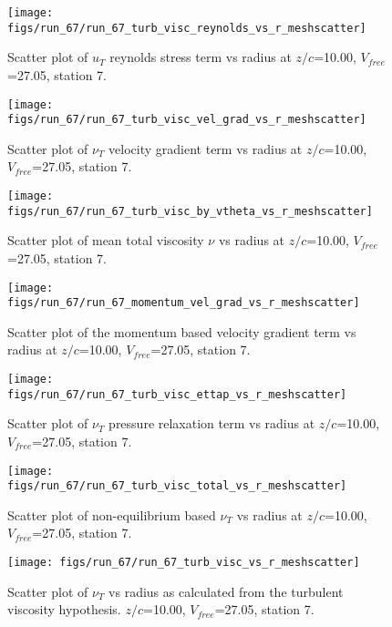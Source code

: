\begin{figure}[H]
\centering
\texttt{[image: figs/run\_67/run\_67\_turb\_visc\_reynolds\_vs\_r\_meshscatter]}
\caption{Scatter plot of $
u_T$ reynolds stress term vs radius at $z/c$=10.00, $V_{free}$=27.05, station 7.}
\end{figure}


\begin{figure}[H]
\centering
\texttt{[image: figs/run\_67/run\_67\_turb\_visc\_vel\_grad\_vs\_r\_meshscatter]}
\caption{Scatter plot of $\nu_T$ velocity gradient term vs radius at $z/c$=10.00, $V_{free}$=27.05, station 7.}
\end{figure}


\begin{figure}[H]
\centering
\texttt{[image: figs/run\_67/run\_67\_turb\_visc\_by\_vtheta\_vs\_r\_meshscatter]}
\caption{Scatter plot of mean total viscosity $\nu$ vs radius at $z/c$=10.00, $V_{free}$=27.05, station 7.}
\end{figure}


\begin{figure}[H]
\centering
\texttt{[image: figs/run\_67/run\_67\_momentum\_vel\_grad\_vs\_r\_meshscatter]}
\caption{Scatter plot of the momentum based velocity gradient term vs radius at $z/c$=10.00, $V_{free}$=27.05, station 7.}
\end{figure}


\begin{figure}[H]
\centering
\texttt{[image: figs/run\_67/run\_67\_turb\_visc\_ettap\_vs\_r\_meshscatter]}
\caption{Scatter plot of $\nu_T$ pressure relaxation term vs radius at $z/c$=10.00, $V_{free}$=27.05, station 7.}
\end{figure}


\begin{figure}[H]
\centering
\texttt{[image: figs/run\_67/run\_67\_turb\_visc\_total\_vs\_r\_meshscatter]}
\caption{Scatter plot of non-equilibrium based $\nu_T$ vs radius at $z/c$=10.00, $V_{free}$=27.05, station 7.}
\end{figure}


\begin{figure}[H]
\centering
\texttt{[image: figs/run\_67/run\_67\_turb\_visc\_vs\_r\_meshscatter]}
\caption{Scatter plot of $\nu_T$ vs radius as calculated from the turbulent viscosity hypothesis. $z/c$=10.00, $V_{free}$=27.05, station 7.}
\end{figure}



